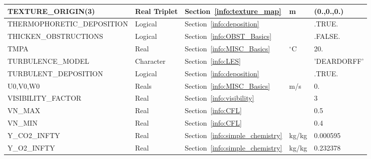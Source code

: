 \documentclass[11pt]{book}
\begin{document}
\begin{longtable}{@{\extracolsep{\fill}}|l|l|l|l|l|}
{\ct TEXTURE\_ORIGIN(3)}                        & Real Triplet  & Section~\ref{info:texture_map}                        & m             & (0.,0.,0.)        \\ \hline
{\ct THERMOPHORETIC\_DEPOSITION}                & Logical       & Section~\ref{info:deposition}                         &               & {\ct .TRUE.}      \\ \hline
{\ct THICKEN\_OBSTRUCTIONS}                     & Logical       & Section~\ref{info:OBST_Basics}                        &               & {\ct .FALSE.}     \\ \hline
{\ct TMPA}                                      & Real          & Section~\ref{info:MISC_Basics}                        & $^\circ$C     & 20.               \\ \hline
{\ct TURBULENCE\_MODEL}                         & Character     & Section~\ref{info:LES}                                &               & {\ct 'DEARDORFF'} \\ \hline
{\ct TURBULENT\_DEPOSITION}                     & Logical       & Section~\ref{info:deposition}                         &               & {\ct .TRUE.}      \\ \hline
{\ct U0,V0,W0}                                  & Reals         & Section~\ref{info:MISC_Basics}                        & m/s           & 0.                \\ \hline
{\ct VISIBILITY\_FACTOR}                        & Real          & Section~\ref{info:visibility}                         &               & 3                 \\ \hline
{\ct VN\_MAX}                                   & Real          & Section~\ref{info:CFL}                                &               & 0.5               \\ \hline
{\ct VN\_MIN}                                   & Real          & Section~\ref{info:CFL}                                &               & 0.4               \\ \hline
{\ct Y\_CO2\_INFTY}                             & Real          & Section~\ref{info:simple_chemistry}                   &  kg/kg        & 0.000595          \\ \hline
{\ct Y\_O2\_INFTY}                              & Real          & Section~\ref{info:simple_chemistry}                   &  kg/kg        & 0.232378          \\ \hline
\end{longtable}
\end{document}
